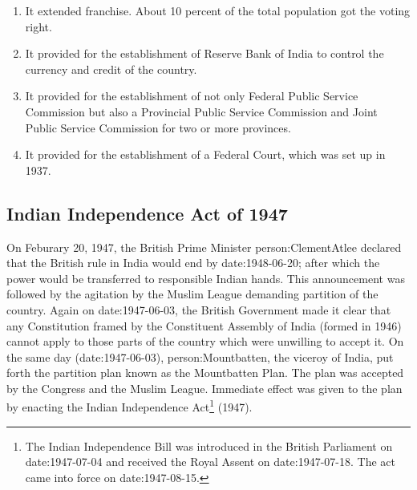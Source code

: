 \begin{enumerate}
  \item It extended franchise. About 10 percent of the total population got the voting right.
  \item It provided for the establishment of Reserve Bank of India to control the currency and credit of the country.
  \item It provided for the establishment of not only Federal Public Service Commission but also a Provincial Public Service Commission and Joint Public Service Commission for two or more provinces.
  \item It provided for the establishment of a Federal Court, which was set up in 1937.
\end{enumerate}


\subsection{Indian Independence Act of 1947}

On Feburary 20, 1947, the British Prime Minister \gls{person:ClementAtlee} declared that the British rule in India would end by \gls{date:1948-06-20}; after which the power would be transferred to responsible Indian hands. This announcement was followed by the agitation by the Muslim League demanding partition of the country. Again on \gls{date:1947-06-03}, the British Government made it clear that any Constitution framed by the Constituent Assembly of India (formed in 1946) cannot apply to those parts of the country which were unwilling to accept it. On the same day (\gls{date:1947-06-03}), \gls{person:Mountbatten}, the viceroy of India, put forth the partition plan known as the Mountbatten Plan. The plan was accepted by the Congress and the Muslim League. Immediate effect was given to the plan by enacting the Indian Independence Act\footnote{The Indian Independence Bill was introduced in the British Parliament on \gls{date:1947-07-04} and received the Royal Assent on \gls{date:1947-07-18}. The act came into force on \gls{date:1947-08-15}.} (1947).

